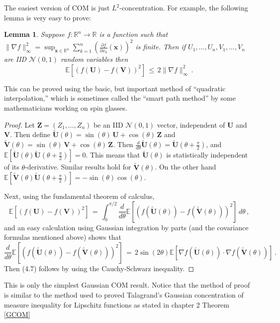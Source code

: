 \documentclass[12pt]{report}
\newtheorem{lemma}[theorem]{Lemma}
\newcommand{\R}{\mathbb{R}}
\newcommand{\E}{\mathbb{E}}
\newcommand{\be}{\begin{equation}}
\newcommand{\ee}{\end{equation}}
\theoremstyle{definition}
\begin{document}
The easiest version of COM is just $L^2$-concentration. For example, the following lemma is very easy to prove:
\begin{lemma}
\label{lem:unifGrad}
Suppose $f : \R^n \to \R$ is a function such that \\
$\|\nabla f\|^2_{\infty} = \sup_{\mathbf{x} \in \R^n} \sum_{k=1}^n \left(\frac{\partial f}{\partial x_k}(\mathbf{x})\right)^2$ is finite.
Then if $U_1,\dots,U_n,V_1,\dots,V_n$ are IID $\mathcal{N}(0,1)$ random variables then
\be
\label{eq:lemG}
\E\left[\left(f(\mathbf{U})-f(\mathbf{V})\right)^2\right]\, \leq\, 2 \|\nabla f\|_{\infty}^2\, .
\ee
\end{lemma}
This can be proved using the basic, but important method of ``quadratic interpolation,'' which is sometimes
called the ``smart path method'' by some mathematicians working on spin glasses.
\begin{proof}
Let $\boldsymbol{Z} = (Z_1,\dots,Z_n)$ be an IID $\mathcal{N}(0,1)$ vector, independent of 
$\mathbf{U}$ and $\mathbf{V}$. Then define $\widetilde{\mathbf{U}}(\theta) = \sin(\theta)\, \mathbf{U} 
+ \cos(\theta)\, \mathbf{Z}$ and $\widetilde{\mathbf{V}}(\theta) = \sin(\theta)\, \mathbf{V} 
+ \cos(\theta)\, \mathbf{Z}$.
Then $\frac{d}{d\theta} \widetilde{\mathbf{U}}(\theta) = \widetilde{\mathbf{U}}(\theta+\frac{\pi}{2})$,
and $\E[\widetilde{\mathbf{U}}(\theta) \widetilde{\mathbf{U}}(\theta+\frac{\pi}{2})] = 0$.
This means that $\widetilde{\mathbf{U}}(\theta)$ is statistically independent of its $\theta$-derivative.
Similar results hold for $\widetilde{\mathbf{V}}(\theta)$.
On the other hand $\E[\widetilde{\mathbf{V}}(\theta) \widetilde{\mathbf{U}}(\theta+\frac{\pi}{2})] = 
-\sin(\theta)\cos(\theta)$.

Next, using the fundamental theorem of calculus,
\be
\E\left[\left(f(\mathbf{U})-f(\mathbf{V})\right)^2\right]\,
=\, \int_0^{\pi/2} \frac{d}{d\theta}
\E\left[\left(f(\widetilde{\mathbf{U}}(\theta))-f(\widetilde{\mathbf{V}}(\theta))\right)^2\right]\,
d\theta\, ,
\ee
and an easy calculation using Gaussian integration by parts (and the covariance formulas mentioned above) shows that 
\be
\frac{d}{d\theta}
\E\left[\left(f(\widetilde{\mathbf{U}}(\theta))-f(\widetilde{\mathbf{V}}(\theta))\right)^2\right]\,
=\, 2\sin(2\theta) \E\left[\nabla f(\widetilde{\mathbf{U}}(\theta)) \cdot 
\nabla f(\widetilde{\mathbf{V}}(\theta))\right]\, .
\ee
Then (4.7) follows by using the Cauchy-Schwarz inequality.
\end{proof}
This is only the simplest Gaussian COM result. Notice that the method of proof is similar to the method used to proved Talagrand's Gaussian concentration of measure inequality for Lipschitz functions as stated in chapter 2 Theorem \ref{GCOM} 
\end{document}
